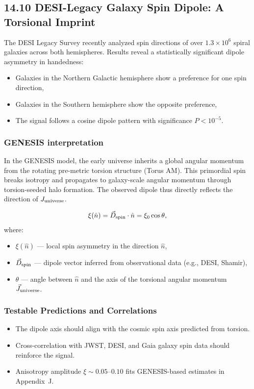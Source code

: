 \documentclass{article}
\begin{document}
\subsection*{14.10 DESI-Legacy Galaxy Spin Dipole: A Torsional Imprint}
\label{sec:desi_spin_dipole}

The DESI Legacy Survey recently analyzed spin directions of over $1.3 \times 10^6$ spiral galaxies across both hemispheres. Results reveal a statistically significant dipole asymmetry in handedness:
\begin{itemize}
  \item Galaxies in the Northern Galactic hemisphere show a preference for one spin direction,
  \item Galaxies in the Southern hemisphere show the opposite preference,
  \item The signal follows a cosine dipole pattern with significance $P < 10^{-5}$.
\end{itemize}

\subsubsection*{GENESIS interpretation}
In the GENESIS model, the early universe inherits a global angular momentum from the rotating pre-metric torsion structure (Torus AM). This primordial spin breaks isotropy and propagates to galaxy-scale angular momentum through torsion-seeded halo formation. The observed dipole thus directly reflects the direction of $J_{\rm universe}$.

\[
\xi(\hat{n}) = \vec{D}_{\rm spin} \cdot \hat{n} = \xi_0 \cos \theta,
\]
\vspace{0.2cm}
\noindent
where:
\begin{itemize}
  \item $\xi(\hat{n})$ — local spin asymmetry in the direction $\hat{n}$,
  \item $\vec{D}_{\rm spin}$ — dipole vector inferred from observational data (e.g., DESI, Shamir),
  \item $\theta$ — angle between $\hat{n}$ and the axis of the torsional angular momentum $\vec{J}_{\rm universe}$.
\end{itemize}


\subsubsection*{Testable Predictions and Correlations}
\begin{itemize}
  \item The dipole axis should align with the cosmic spin axis predicted from torsion.
  \item Cross-correlation with JWST, DESI, and Gaia galaxy spin data should reinforce the signal.
  \item Anisotropy amplitude $\xi \sim 0.05$--$0.10$ fits GENESIS-based estimates in Appendix~J.
\end{itemize}
\end{document}
